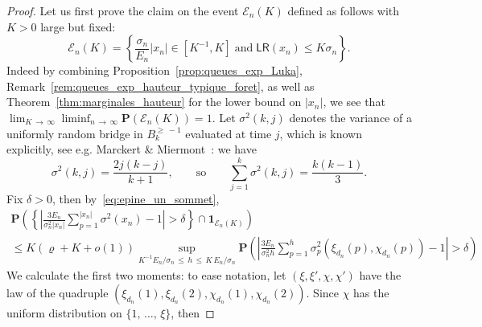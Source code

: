 \documentclass[10pt]{amsart}
\theoremstyle{definition}\newtheorem{defi}[theo]{Definition}\newtheorem{rema}[theo]{Remark}\newtheorem{exam}[theo]{Example}\newtheorem{exem}[theo]{Example}\newtheorem{nota}[theo]{Notation}
\newcommand{\ensembles}[1]{\mathbf{#1}}
\renewcommand{\P}{\ensembles{P}}
\renewcommand{\Pr}[1]{\P\left(#1\right)}
\newcommand{\1}{\ensembles{1}}
\renewcommand{\le}{\leqslant}
\renewcommand{\ge}{\geqslant}
\newcommand{\LR}{\mathsf{LR}}
\newcommand{\BBmap}{B}
\newcommand{\clE}{\mathcal{E}}
\newcommand{\edges}{E}
\providecommand{\?}{}
\begin{document}
\begin{proof}
Let us first prove the claim on the event $\clE_n(K)$ defined as follows with $K > 0$ large but fixed:
\begin{equation}\label{eq:bon_evenement_marginales_labels}
\clE_n(K) = \left\{\frac{\sigma_n}{\edges_n} |x_n| \in \left[K^{-1}, K\right]\; \text{and}\; \LR(x_n) \le K \sigma_n\right\}.
\end{equation}
Indeed by combining Proposition~\ref{prop:queues_exp_Luka}, Remark~\ref{rem:queues_exp_hauteur_typique_foret}, as well as Theorem~\ref{thm:marginales_hauteur} for the lower bound on $|x_n|$, we see that $\lim_{K\,\to\,\infty} \liminf_{n \,\to\,\infty} \Pr{\clE_n(K)} = 1$. Let $\sigma^2(k,j)$ denotes the variance of a uniformly random bridge in $\BBmap_k^{\ge\,-1}$ evaluated at time $j$, which is known explicitly, see e.g. Marckert \& Miermont~\cite[page 1664\footnote{Note that they consider uniform random bridges in $\BBmap_{k+1}^{\ge\,-1}$!}]{MM07}: we have
\[
\sigma^2(k,j) = \frac{2j(k-j)}{k+1},
\qquad\text{so}\qquad
\sum_{j=1}^k \sigma^2(k,j) = \frac{k(k-1)}{3}.
\]
Fix $\delta > 0$, then by~\eqref{eq:epine_un_sommet},
\begin{multline*}
\Pr{\left\{\left|\frac{3 \edges_n}{\sigma_n^2 |x_n|} \sum_{p = 1}^{|x_n|} \sigma^2(x_n) - 1\right| > \delta\right\} \cap \1_{\clE_n(K)}}
\\
\le K (\varrho + K + o(1)) \sup_{K^{-1} \edges_n / \sigma_n\,\le\,h\,\le\,K\,\edges_n / \sigma_n} \Pr{\left|\frac{3 \edges_n}{\sigma_n^2 h} \sum_{p = 1}^h \sigma^2_p\left(\xi_{d_n}(p), \chi_{d_n}(p)\right) - 1\right| > \delta}
\end{multline*}
We calculate the first two moments: to ease notation, let $(\xi, \xi', \chi, \chi')$ have the law of the quadruple $(\xi_{d_n}(1), \xi_{d_n}(2), \chi_{d_n}(1), \chi_{d_n}(2))$. Since $\chi$ has the uniform distribution on $\{1,\,\dots,\,\xi\}$, then


\end{proof}
\end{document}
